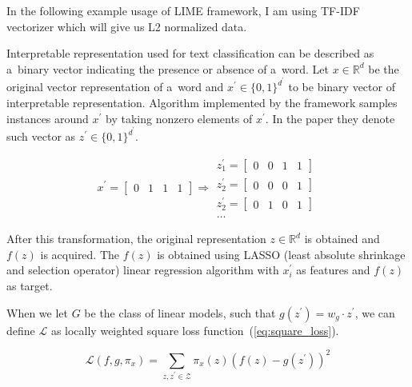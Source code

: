In the following example usage of LIME framework, I am using TF-IDF vectorizer which will give us L2 normalized data.

Interpretable representation used for text classification can be described as a~binary vector indicating the presence or absence of a~word.
Let \( x \in \mathbb{R}^d \) be the original vector representation of a~word and \( x^\prime \in \{ 0, 1 \}^{d^\prime} \) to be binary vector of interpretable representation.
Algorithm implemented by the framework samples instances around \( x^\prime \) by taking nonzero elements of \( x^\prime \).
In the paper they denote such vector as \( z^\prime \in \{ 0, 1 \}^{d^\prime} \).

\begin{equation} \label{eq:perturbed_sample}
    x^\prime = \begin{bmatrix} 0 & 1 & 1 & 1 \end{bmatrix}
    \Rightarrow
    \begin{matrix}
        z^\prime_1 = \begin{bmatrix} 0 & 0 & 1 & 1 \end{bmatrix} \\
        z^\prime_2 = \begin{bmatrix} 0 & 0 & 0 & 1 \end{bmatrix} \\
        z^\prime_2 = \begin{bmatrix} 0 & 1 & 0 & 1 \end{bmatrix} \\
        \ldots
    \end{matrix}
\end{equation}

After this transformation, the original representation \( z \in \mathbb{R}^d \) is obtained and \( f(z) \) is acquired.
The \( f(z) \) is obtained using LASSO (least absolute shrinkage and selection operator) linear regression algorithm with \( x^\prime_i \) as features and \( f(z) \) as target.

When we let \( G \) be the class of linear models, such that \( g(z^\prime) = w_g \cdot z^\prime \), we can define \( \mathcal{L} \) as locally weighted square loss function~(\ref{eq:square_loss}).

\begin{equation} \label{eq:square_loss}
    \mathcal{L}(f, g, \pi_x) = \sum_{z, z^\prime \in \mathcal{Z}} \pi_x(z) \left( f(z) - g(z^\prime) \right)^2
\end{equation}

